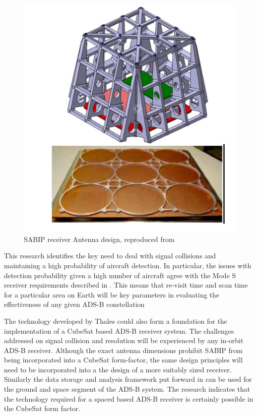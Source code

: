 \begin{figure}[htb]
	\centering
	\includegraphics[scale = 0.8]{Pictures/sapid_spotbeams.png}
	
	\caption[SAPID receiver Antenna design]{SABIP receiver Antenna design, reproduced from \cite{Blomenhofer2012}}
	\label{fig:sapid_spotbeams}
\end{figure}

This research identifies the key need to deal with signal collisions and maintaining a high probability of aircraft detection. In particular, the issues with detection probability given a high number of aircraft agree with the Mode S receiver requirements described in \cite{Orlando2001}. This means that re-visit time and scan time for a particular area on Earth will be key parameters in evaluating the effectiveness of any given ADS-B constellation

The technology developed by Thales could also form a foundation for the implementation of a CubeSat based ADS-B receiver system. The challenges addressed on signal collision and resolution will be experienced by any in-orbit ADS-B receiver. Although the exact antenna dimensions prohibit SABIP from being incorporated into a CubeSat form-factor, the same design principles will need to be incorporated into a the design of a more suitably sized receiver. Similarly the data storage and analysis framework put forward in \cite{Blomenhofer2012} can be used for the ground and space segment of the ADS-B system. The research indicates that the technology required for a spaced based ADS-B receiver is certainly possible in the CubeSat form factor.


